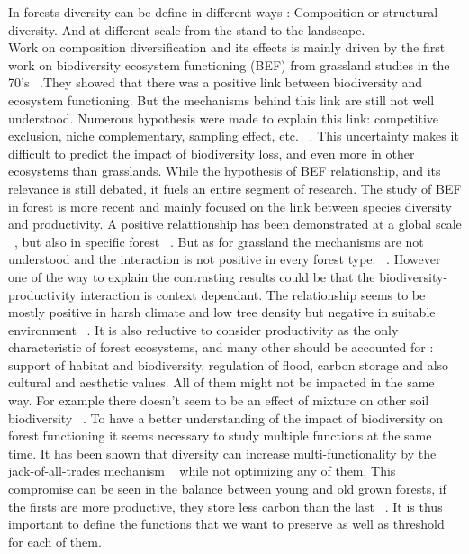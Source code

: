 \documentclass{article}
\begin{document}
In forests diversity can be define in different ways : Composition or structural diversity. And at different scale from the stand to the landscape.\\
Work on composition diversification and its effects is mainly driven by the first work on biodiversity ecosystem functioning (BEF) from grassland studies in the 70's ~\autocite{tilmanBiodiversityPopulationEcosystem1996}.They showed that there was a positive link between biodiversity and ecosystem functioning. But the mechanisms behind this link are still not well understood. Numerous hypothesis were made to explain this link: competitive exclusion, niche complementary, sampling effect, etc. ~\autocite{aliBiodiversityEcosystemFunctioning2023}. This uncertainty makes it difficult to predict the impact of biodiversity loss, and even more in other ecosystems than grasslands.
While the hypothesis of BEF relationship, and its relevance is still debated, it fuels an entire segment of research.
The study of BEF in forest is more recent and mainly focused on the link between species diversity and productivity. A positive relattionship has been demonstrated at a global scale ~\autocite{liangPositiveBiodiversityproductivityRelationship2016}, but also in specific forest ~\autocite{morinTreeSpeciesRichness2011,paquetteEffectBiodiversityTree2011,jourdanManagingMixedStands2021}. But as for grassland the mechanisms are not understood and the interaction is not positive in every forest type. ~\autocite{forresterReviewProcessesDiversity2016}.
However one of the way to explain the contrasting results could be that the biodiversity-productivity interaction is context dependant. The relationship seems to be mostly positive in harsh climate and low tree density but negative in suitable environment ~\autocite{juckerClimateModulatesEffects2016}.
It is also reductive to consider productivity as the only characteristic of forest ecosystems, and many other should be accounted for : support of habitat and biodiversity, regulation of flood, carbon storage and also cultural and aesthetic values.
All of them might not be impacted in the same way. For example there doesn't seem to be an effect of mixture on other soil biodiversity ~\autocite{korboulewskyHowTreeDiversity2016}.
To have a better understanding of the impact of biodiversity on forest functioning it seems necessary to study multiple functions at the same time. It has been shown that diversity can increase multi-functionality by the jack-of-all-trades mechanism ~\autocite{vanderplasJackofalltradesEffectsDrive2016} while not optimizing any of them. This compromise can be seen in the balance between young and old grown forests, if the firsts are more productive, they store less carbon than the last ~\autocite{caspersenSuccessionalDiversityForest2001}. It is thus important to define the functions that we want to preserve as well as threshold for each of them.
\end{document}
